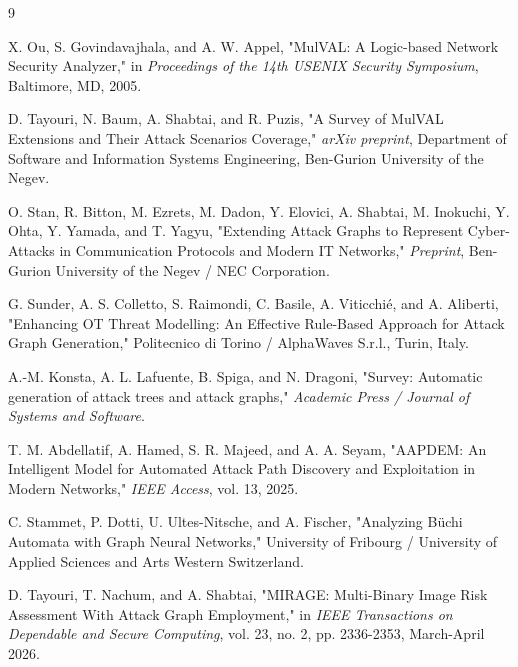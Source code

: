 \documentclass[target=mst,aauheader=aics,style=]{thud}
\begin{document}
\backmatter


\begin{thebibliography}{9}

X. Ou, S. Govindavajhala, and A. W. Appel, 
"MulVAL: A Logic-based Network Security Analyzer," 
in \emph{Proceedings of the 14th USENIX Security Symposium}, Baltimore, MD, 2005.

D. Tayouri, N. Baum, A. Shabtai, and R. Puzis, 
"A Survey of MulVAL Extensions and Their Attack Scenarios Coverage," 
\emph{arXiv preprint}, Department of Software and Information Systems Engineering, Ben-Gurion University of the Negev.

O. Stan, R. Bitton, M. Ezrets, M. Dadon, Y. Elovici, A. Shabtai, M. Inokuchi, Y. Ohta, Y. Yamada, and T. Yagyu, 
"Extending Attack Graphs to Represent Cyber-Attacks in Communication Protocols and Modern IT Networks," 
\emph{Preprint}, Ben-Gurion University of the Negev / NEC Corporation.

G. Sunder, A. S. Colletto, S. Raimondi, C. Basile, A. Viticchié, and A. Aliberti, 
"Enhancing OT Threat Modelling: An Effective Rule-Based Approach for Attack Graph Generation," 
Politecnico di Torino / AlphaWaves S.r.l., Turin, Italy.

A.-M. Konsta, A. L. Lafuente, B. Spiga, and N. Dragoni, 
"Survey: Automatic generation of attack trees and attack graphs," 
\emph{Academic Press / Journal of Systems and Software}.

T. M. Abdellatif, A. Hamed, S. R. Majeed, and A. A. Seyam, 
"AAPDEM: An Intelligent Model for Automated Attack Path Discovery and Exploitation in Modern Networks," 
\emph{IEEE Access}, vol. 13, 2025.

C. Stammet, P. Dotti, U. Ultes-Nitsche, and A. Fischer, 
"Analyzing Büchi Automata with Graph Neural Networks," 
University of Fribourg / University of Applied Sciences and Arts Western Switzerland.

D. Tayouri, T. Nachum, and A. Shabtai, 
"MIRAGE: Multi-Binary Image Risk Assessment With Attack Graph Employment," 
in \emph{IEEE Transactions on Dependable and Secure Computing}, vol. 23, no. 2, pp. 2336-2353, March-April 2026.

\end{thebibliography}
\end{document}
